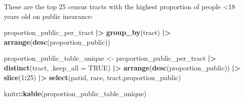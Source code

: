 \documentclass[
]{article}
\newenvironment{Shaded}{\begin{snugshade}}{\end{snugshade}}
\newcommand{\AttributeTok}[1]{\textcolor[rgb]{0.13,0.29,0.53}{#1}}
\newcommand{\ConstantTok}[1]{\textcolor[rgb]{0.56,0.35,0.01}{#1}}
\newcommand{\DecValTok}[1]{\textcolor[rgb]{0.00,0.00,0.81}{#1}}
\newcommand{\FunctionTok}[1]{\textcolor[rgb]{0.13,0.29,0.53}{\textbf{#1}}}
\newcommand{\NormalTok}[1]{#1}
\newcommand{\OtherTok}[1]{\textcolor[rgb]{0.56,0.35,0.01}{#1}}
\newcommand{\SpecialCharTok}[1]{\textcolor[rgb]{0.81,0.36,0.00}{\textbf{#1}}}
\begin{document}
These are the top 25 census tracts with the highest proportion of people
\textless18 years old on public insurance:

\begin{Shaded}
\begin{Highlighting}[]
\NormalTok{proportion\_public\_per\_tract }\SpecialCharTok{|\textgreater{}}
  \FunctionTok{group\_by}\NormalTok{(tract) }\SpecialCharTok{|\textgreater{}}
  \FunctionTok{arrange}\NormalTok{(}\FunctionTok{desc}\NormalTok{(proportion\_public))}
\end{Highlighting}
\end{Shaded}

\begin{Shaded}
\begin{Highlighting}[]
\NormalTok{proportion\_public\_table\_unique }\OtherTok{\textless{}{-}}\NormalTok{ proportion\_public\_per\_tract }\SpecialCharTok{|\textgreater{}} 
  \FunctionTok{distinct}\NormalTok{(tract, }\AttributeTok{.keep\_all =} \ConstantTok{TRUE}\NormalTok{) }\SpecialCharTok{|\textgreater{}}
  \FunctionTok{arrange}\NormalTok{(}\FunctionTok{desc}\NormalTok{(proportion\_public)) }\SpecialCharTok{|\textgreater{}}
  \FunctionTok{slice}\NormalTok{(}\DecValTok{1}\SpecialCharTok{:}\DecValTok{25}\NormalTok{) }\SpecialCharTok{|\textgreater{}}
  \FunctionTok{select}\NormalTok{(patid, race, tract,proportion\_public)}

\NormalTok{knitr}\SpecialCharTok{::}\FunctionTok{kable}\NormalTok{(proportion\_public\_table\_unique)}
\end{Highlighting}
\end{Shaded}
\end{document}
